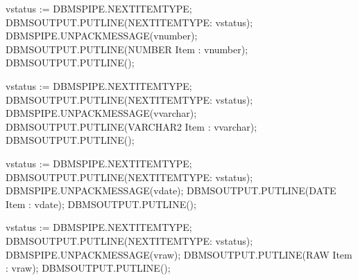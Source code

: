 \documentclass[letterpaper,10pt,english,openany,oneside]{sphinxmanual}
\begin{document}
\begin{sphinxVerbatim}[commandchars=\\\{\}]
    v\PYGZus{}status := DBMS\PYGZus{}PIPE.NEXT\PYGZus{}ITEM\PYGZus{}TYPE;
    DBMS\PYGZus{}OUTPUT.PUT\PYGZus{}LINE(\PYGZsq{}NEXT\PYGZus{}ITEM\PYGZus{}TYPE: \PYGZsq{} \textbar{}\textbar{} v\PYGZus{}status);
    DBMS\PYGZus{}PIPE.UNPACK\PYGZus{}MESSAGE(v\PYGZus{}number);
    DBMS\PYGZus{}OUTPUT.PUT\PYGZus{}LINE(\PYGZsq{}NUMBER Item   : \PYGZsq{} \textbar{}\textbar{} v\PYGZus{}number);
    DBMS\PYGZus{}OUTPUT.PUT\PYGZus{}LINE(\PYGZsq{}\PYGZhy{}\PYGZhy{}\PYGZhy{}\PYGZhy{}\PYGZhy{}\PYGZhy{}\PYGZhy{}\PYGZhy{}\PYGZhy{}\PYGZhy{}\PYGZhy{}\PYGZhy{}\PYGZhy{}\PYGZhy{}\PYGZhy{}\PYGZhy{}\PYGZhy{}\PYGZhy{}\PYGZhy{}\PYGZhy{}\PYGZhy{}\PYGZhy{}\PYGZhy{}\PYGZhy{}\PYGZhy{}\PYGZhy{}\PYGZhy{}\PYGZhy{}\PYGZhy{}\PYGZhy{}\PYGZhy{}\PYGZhy{}\PYGZhy{}\PYGZhy{}\PYGZsq{});

    v\PYGZus{}status := DBMS\PYGZus{}PIPE.NEXT\PYGZus{}ITEM\PYGZus{}TYPE;
    DBMS\PYGZus{}OUTPUT.PUT\PYGZus{}LINE(\PYGZsq{}NEXT\PYGZus{}ITEM\PYGZus{}TYPE: \PYGZsq{} \textbar{}\textbar{} v\PYGZus{}status);
    DBMS\PYGZus{}PIPE.UNPACK\PYGZus{}MESSAGE(v\PYGZus{}varchar);
    DBMS\PYGZus{}OUTPUT.PUT\PYGZus{}LINE(\PYGZsq{}VARCHAR2 Item : \PYGZsq{} \textbar{}\textbar{} v\PYGZus{}varchar);
    DBMS\PYGZus{}OUTPUT.PUT\PYGZus{}LINE(\PYGZsq{}\PYGZhy{}\PYGZhy{}\PYGZhy{}\PYGZhy{}\PYGZhy{}\PYGZhy{}\PYGZhy{}\PYGZhy{}\PYGZhy{}\PYGZhy{}\PYGZhy{}\PYGZhy{}\PYGZhy{}\PYGZhy{}\PYGZhy{}\PYGZhy{}\PYGZhy{}\PYGZhy{}\PYGZhy{}\PYGZhy{}\PYGZhy{}\PYGZhy{}\PYGZhy{}\PYGZhy{}\PYGZhy{}\PYGZhy{}\PYGZhy{}\PYGZhy{}\PYGZhy{}\PYGZhy{}\PYGZhy{}\PYGZhy{}\PYGZhy{}\PYGZhy{}\PYGZsq{});

    v\PYGZus{}status := DBMS\PYGZus{}PIPE.NEXT\PYGZus{}ITEM\PYGZus{}TYPE;
    DBMS\PYGZus{}OUTPUT.PUT\PYGZus{}LINE(\PYGZsq{}NEXT\PYGZus{}ITEM\PYGZus{}TYPE: \PYGZsq{} \textbar{}\textbar{} v\PYGZus{}status);
    DBMS\PYGZus{}PIPE.UNPACK\PYGZus{}MESSAGE(v\PYGZus{}date);
    DBMS\PYGZus{}OUTPUT.PUT\PYGZus{}LINE(\PYGZsq{}DATE Item     : \PYGZsq{} \textbar{}\textbar{} v\PYGZus{}date);
    DBMS\PYGZus{}OUTPUT.PUT\PYGZus{}LINE(\PYGZsq{}\PYGZhy{}\PYGZhy{}\PYGZhy{}\PYGZhy{}\PYGZhy{}\PYGZhy{}\PYGZhy{}\PYGZhy{}\PYGZhy{}\PYGZhy{}\PYGZhy{}\PYGZhy{}\PYGZhy{}\PYGZhy{}\PYGZhy{}\PYGZhy{}\PYGZhy{}\PYGZhy{}\PYGZhy{}\PYGZhy{}\PYGZhy{}\PYGZhy{}\PYGZhy{}\PYGZhy{}\PYGZhy{}\PYGZhy{}\PYGZhy{}\PYGZhy{}\PYGZhy{}\PYGZhy{}\PYGZhy{}\PYGZhy{}\PYGZhy{}\PYGZhy{}\PYGZsq{});

    v\PYGZus{}status := DBMS\PYGZus{}PIPE.NEXT\PYGZus{}ITEM\PYGZus{}TYPE;
    DBMS\PYGZus{}OUTPUT.PUT\PYGZus{}LINE(\PYGZsq{}NEXT\PYGZus{}ITEM\PYGZus{}TYPE: \PYGZsq{} \textbar{}\textbar{} v\PYGZus{}status);
    DBMS\PYGZus{}PIPE.UNPACK\PYGZus{}MESSAGE(v\PYGZus{}raw);
    DBMS\PYGZus{}OUTPUT.PUT\PYGZus{}LINE(\PYGZsq{}RAW Item      : \PYGZsq{} \textbar{}\textbar{} v\PYGZus{}raw);
    DBMS\PYGZus{}OUTPUT.PUT\PYGZus{}LINE(\PYGZsq{}\PYGZhy{}\PYGZhy{}\PYGZhy{}\PYGZhy{}\PYGZhy{}\PYGZhy{}\PYGZhy{}\PYGZhy{}\PYGZhy{}\PYGZhy{}\PYGZhy{}\PYGZhy{}\PYGZhy{}\PYGZhy{}\PYGZhy{}\PYGZhy{}\PYGZhy{}\PYGZhy{}\PYGZhy{}\PYGZhy{}\PYGZhy{}\PYGZhy{}\PYGZhy{}\PYGZhy{}\PYGZhy{}\PYGZhy{}\PYGZhy{}\PYGZhy{}\PYGZhy{}\PYGZhy{}\PYGZhy{}\PYGZhy{}\PYGZhy{}\PYGZhy{}\PYGZsq{});


\end{sphinxVerbatim}
\end{document}
